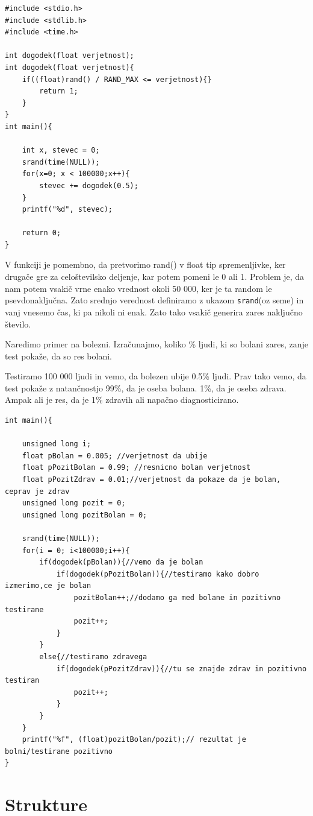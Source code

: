\documentclass[a4paper, 12pt]{article}
\begin{document}
\begin{lstlisting}
#include <stdio.h>
#include <stdlib.h>
#include <time.h>

int dogodek(float verjetnost);
int dogodek(float verjetnost){
	if((float)rand() / RAND_MAX <= verjetnost){}
		return 1;
	}
}
int main(){

	int x, stevec = 0;
	srand(time(NULL));
	for(x=0; x < 100000;x++){
		stevec += dogodek(0.5);
	}
	printf("%d", stevec);

	return 0;
}
\end{lstlisting}

V funkciji je pomembno, da pretvorimo rand() v float tip spremenljivke, ker drugače gre za celoštevilsko deljenje, kar potem pomeni le 0 ali 1. Problem je, da nam potem vsakič vrne enako vrednost okoli 50 000, ker je ta random le psevdonaključna. Zato srednjo verednost definiramo z ukazom \texttt{srand}(oz seme) in vanj vnesemo čas, ki pa nikoli ni enak. Zato tako vsakič generira zares naključno število.

Naredimo primer na bolezni. Izračunajmo, koliko \% ljudi, ki so bolani zares, zanje test pokaže, da so res bolani.

Testiramo 100 000 ljudi in vemo, da bolezen ubije 0.5\% ljudi. Prav tako vemo, da test pokaže z natančnostjo 99\%, da je oseba bolana. 1\%, da je oseba zdrava. Ampak ali je res, da je 1\% zdravih ali napačno diagnosticirano.

\begin{lstlisting}
int main(){

    unsigned long i;
	float pBolan = 0.005; //verjetnost da ubije
	float pPozitBolan = 0.99; //resnicno bolan verjetnost
	float pPozitZdrav = 0.01;//verjetnost da pokaze da je bolan, ceprav je zdrav
	unsigned long pozit = 0;
	unsigned long pozitBolan = 0;
	
	srand(time(NULL));
	for(i = 0; i<100000;i++){
		if(dogodek(pBolan)){//vemo da je bolan
			if(dogodek(pPozitBolan)){//testiramo kako dobro izmerimo,ce je bolan
				pozitBolan++;//dodamo ga med bolane in pozitivno testirane
				pozit++;
			}
		}
		else{//testiramo zdravega
			if(dogodek(pPozitZdrav)){//tu se znajde zdrav in pozitivno testiran
				pozit++;
			}
		}
	}
	printf("%f", (float)pozitBolan/pozit);// rezultat je bolni/testirane pozitivno
}
\end{lstlisting}

\section{Strukture}
\end{document}

